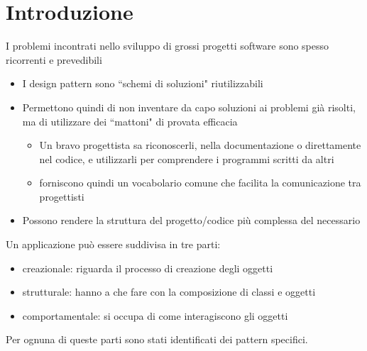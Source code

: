 \documentclass{article}
\begin{document}
\maketitle



\newpage
\tableofcontents
\newpage



\section{Introduzione}
I problemi incontrati nello sviluppo di grossi progetti software sono spesso ricorrenti e prevedibili
\begin{itemize}
\item I  design pattern sono ``schemi di soluzioni" riutilizzabili
\item  Permettono quindi di non inventare da capo soluzioni ai problemi gi\`a risolti, ma di utilizzare dei ``mattoni" di provata efficacia
\begin{itemize}
\item Un bravo progettista sa riconoscerli, nella documentazione o direttamente nel codice, e utilizzarli per comprendere i programmi scritti da altri
\item forniscono quindi un vocabolario comune che facilita la comunicazione tra progettisti
\end{itemize}
\item Possono rendere la struttura del progetto/codice pi\`u complessa del necessario
\end{itemize}

Un applicazione pu\`o essere suddivisa in tre parti:
\begin{itemize}
\item creazionale: riguarda il processo di creazione degli oggetti
\item strutturale: hanno a che fare con la composizione di classi e oggetti
\item comportamentale: si occupa di come interagiscono gli oggetti
\end{itemize}
Per ognuna di queste parti sono stati identificati dei pattern specifici.  
\end{document}

